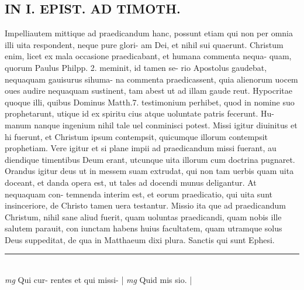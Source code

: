 \documentclass{article}
\begin{document}
\begin{pages}
\section*{IN I. EPIST. AD TIMOTH. }\pstart Impelliautem mittique ad praedicandum hanc, possunt etiam qui non per omnia illi uita respondent, neque pure glori- am Dei, et nihil sui quaerunt. Christum enim, licet ex mala occasione praedicabant, et humana commenta nequa- quam, quorum Paulus Philpp. 2. meminit, id tamen se- rio Apostolus gaudebat, nequaquam gauisurus sihuma- na commenta praedicassent, quia alienorum uocem oues audire nequaquam sustinent, tam abest ut ad illam gaude reut. Hypocritae quoque illi, quibus Dominus Matth.7. testimonium perhibet, quod in nomine suo prophetarunt, utique id ex spiritu cius atque uoluntate patris fecerunt. Hu- manum nanque ingenium nihil tale uel conminisci potest.  Missi igitur diuinitus et hi fuerunt, et Christum ipsum contempsit, quicumque illorum contempsit prophetiam.  Vere igitur et si plane impii ad praedicandum missi fuerant, au diendique timentibus Deum erant, utcunque uita illorum cum doctrina pugnaret.   \pend\pstart Orandus igitur deus ut in messem suam extrudat, qui non tam uerbis quam uita doceant, et danda opera est, ut tales ad docendi munus deligantur. At nequaquam con- temnenda interim est, et eorum praedicatio, qui uita sunt insinceriore, de Christo tamen uera testantur.  Missio ita que ad praedicandum Christum, nihil sane aliud fuerit, quam uoluntas praedicandi, quam nobis ille salutem parauit, con iunctam habens huius facultatem, quam utramque solus Deus suppeditat, de qua in Matthaeum dixi plura.  Sanctis qui sunt Ephesi.  \pend
\vspace{0.5cm}\noindent
\vspace{0.2cm}\rule{1cm}{0.2pt}\\ 
\hspace{0.2cm}\textit{mg}
\footnotesize Qui cur- rentes et qui missi- 
\normalsize| 
\hspace{0.2cm}\textit{mg}
\footnotesize Quid mis sio.  
\normalsize| 

\end{pages}
\end{document}
